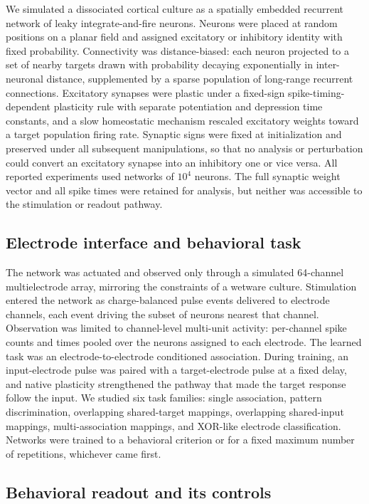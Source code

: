 \documentclass{article}
\begin{document}
We simulated a dissociated cortical culture as a spatially embedded recurrent network of leaky integrate-and-fire neurons. Neurons were placed at random positions on a planar field and assigned excitatory or inhibitory identity with fixed probability. Connectivity was distance-biased: each neuron projected to a set of nearby targets drawn with probability decaying exponentially in inter-neuronal distance, supplemented by a sparse population of long-range recurrent connections. Excitatory synapses were plastic under a fixed-sign spike-timing-dependent plasticity rule with separate potentiation and depression time constants, and a slow homeostatic mechanism rescaled excitatory weights toward a target population firing rate. Synaptic signs were fixed at initialization and preserved under all subsequent manipulations, so that no analysis or perturbation could convert an excitatory synapse into an inhibitory one or vice versa. All reported experiments used networks of $10^4$ neurons. The full synaptic weight vector and all spike times were retained for analysis, but neither was accessible to the stimulation or readout pathway.

\subsection{Electrode interface and behavioral task}

The network was actuated and observed only through a simulated 64-channel multielectrode array, mirroring the constraints of a wetware culture. Stimulation entered the network as charge-balanced pulse events delivered to electrode channels, each event driving the subset of neurons nearest that channel. Observation was limited to channel-level multi-unit activity: per-channel spike counts and times pooled over the neurons assigned to each electrode. The learned task was an electrode-to-electrode conditioned association. During training, an input-electrode pulse was paired with a target-electrode pulse at a fixed delay, and native plasticity strengthened the pathway that made the target response follow the input. We studied six task families: single association, pattern discrimination, overlapping shared-target mappings, overlapping shared-input mappings, multi-association mappings, and XOR-like electrode classification. Networks were trained to a behavioral criterion or for a fixed maximum number of repetitions, whichever came first.

\subsection{Behavioral readout and its controls}
\end{document}
